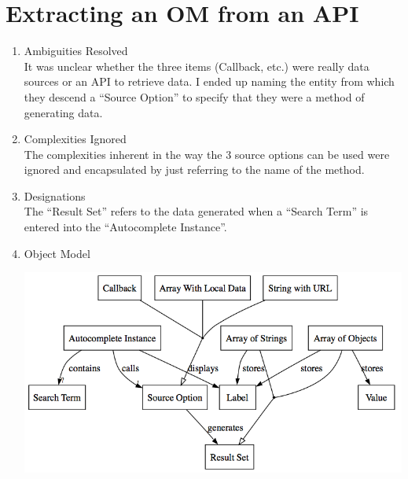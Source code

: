 \documentclass[11pt,letterpaper]{article}
\begin{document}
\section{Extracting an OM from an API}
\begin{enumerate}
\item Ambiguities Resolved\\
It was unclear whether the three items (Callback, etc.) were really data sources or an API to retrieve data. I ended up naming the entity from which they descend a ``Source Option'' to specify that they were a method of generating data.
\item Complexities Ignored\\
The complexities inherent in the way the 3 source options can be used were ignored and encapsulated by just referring to the name of the method.
\item Designations\\
The ``Result Set'' refers to the data generated when a ``Search Term'' is entered into the ``Autocomplete Instance''.
\item Object Model\\
\begin{center}
\includegraphics[width=400pt]{dot/autocomplete.png}
\label{fig:ob6} 
\end{center}
\end{enumerate}
\end{document}

